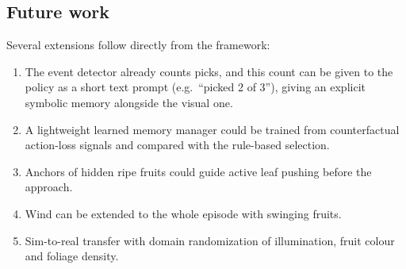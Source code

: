 \subsection{Future work}
Several extensions follow directly from the framework:
\begin{enumerate}
\item The event detector already counts picks, and this count can be given to the policy as a short text prompt (e.g.\ ``picked 2 of 3''), giving an explicit symbolic memory alongside the visual one.
\item A lightweight learned memory manager could be trained from counterfactual action-loss signals and compared with the rule-based selection.
\item Anchors of hidden ripe fruits could guide active leaf pushing before the approach.
\item Wind can be extended to the whole episode with swinging fruits.
\item Sim-to-real transfer with domain randomization of illumination, fruit colour and foliage density.
\end{enumerate}
